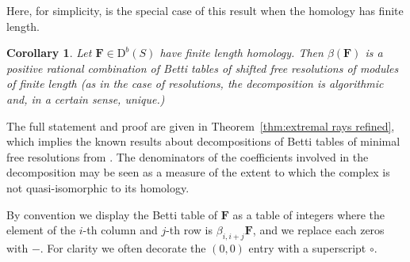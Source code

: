 \documentclass[12pt]{amsart}
\newtheorem{cor}[lemma]{Corollary}
\theoremstyle{definition}
\theoremstyle{remark}
\newcommand{\codim}{\operatorname{codim}}
\newcommand{\FF}{\mathbf{F}}
\newcommand{\DD}{\mathrm{D}}
\begin{document}
Here, for simplicity, is the special case of this result when the homology has finite length. 
%
\begin{cor}\label{cor:decompose}
Let $\FF\in \DD^b(S)$ have finite length homology.  Then $\beta(\FF)$ is a positive rational combination of Betti tables of shifted free resolutions of modules of finite length (as in the case of resolutions, the decomposition is algorithmic and, in a certain sense, unique.)
\end{cor}

The full statement and proof are given in Theorem~\ref{thm:extremal rays refined}, which implies the known results about decompositions of Betti tables
of minimal free resolutions from \cites{eis-schrey1,boij-sod2}.
The denominators of the coefficients involved in the decomposition may be seen as a measure of the extent to which the complex is not quasi-isomorphic to its homology. 

By convention we display the Betti table of $\FF$ as a table
of integers where the element of the $i$-th column and $j$-th row is $\beta_{i,i+j}\FF$, and we replace each zeros with $-$. For clarity we often decorate the $(0,0)$ entry
with a superscript $\circ$.
\end{document}
